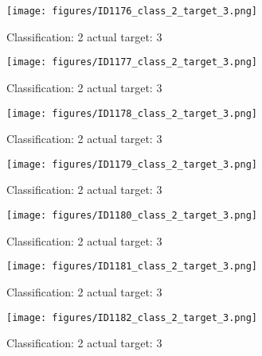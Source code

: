 \begin{figure}[h!]
\begin{center}
\texttt{[image: figures/ID1176\_class\_2\_target\_3.png]}
\end{center}
\caption{ Classification: 2 actual target: 3}
\label{fig:ID1176_class_2_target_3}
\end{figure}
\begin{figure}[h!]
\begin{center}
\texttt{[image: figures/ID1177\_class\_2\_target\_3.png]}
\end{center}
\caption{ Classification: 2 actual target: 3}
\label{fig:ID1177_class_2_target_3}
\end{figure}
\begin{figure}[h!]
\begin{center}
\texttt{[image: figures/ID1178\_class\_2\_target\_3.png]}
\end{center}
\caption{ Classification: 2 actual target: 3}
\label{fig:ID1178_class_2_target_3}
\end{figure}
\begin{figure}[h!]
\begin{center}
\texttt{[image: figures/ID1179\_class\_2\_target\_3.png]}
\end{center}
\caption{ Classification: 2 actual target: 3}
\label{fig:ID1179_class_2_target_3}
\end{figure}
\begin{figure}[h!]
\begin{center}
\texttt{[image: figures/ID1180\_class\_2\_target\_3.png]}
\end{center}
\caption{ Classification: 2 actual target: 3}
\label{fig:ID1180_class_2_target_3}
\end{figure}
\begin{figure}[h!]
\begin{center}
\texttt{[image: figures/ID1181\_class\_2\_target\_3.png]}
\end{center}
\caption{ Classification: 2 actual target: 3}
\label{fig:ID1181_class_2_target_3}
\end{figure}
\begin{figure}[h!]
\begin{center}
\texttt{[image: figures/ID1182\_class\_2\_target\_3.png]}
\end{center}
\caption{ Classification: 2 actual target: 3}
\label{fig:ID1182_class_2_target_3}
\end{figure}
